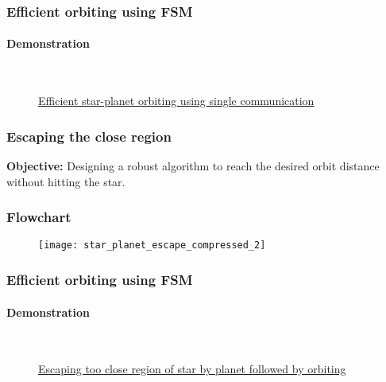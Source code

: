 \begin{frame}
\frametitle{Efficient orbiting using FSM}
\framesubtitle{Demonstration}
	\begin{figure}[H]
		\begin{center}
		\\
		\hspace{5cm}
		\caption{\href{https://youtu.be/LRgOzhAJI1k}{Efficient star-planet orbiting using single communication}}
		\label{fig:shape_formation_demo}
	\end{center}
	\end{figure}
\end{frame}

\begin{frame}
\frametitle{Escaping the close region}
\textbf{Objective:} Designing a robust algorithm to reach the desired orbit distance without hitting the star.
\end{frame}

\begin{frame}
\frametitle{Flowchart}
\begin{figure}[H]
	\centering
	\texttt{[image: star\_planet\_escape\_compressed\_2]}
\end{figure}
\end{frame}

\begin{frame}
\frametitle{Efficient orbiting using FSM}
\framesubtitle{Demonstration}
\begin{figure}[H]
	\begin{center}
	\\
	\hspace{5cm}
	\caption{\href{https://youtu.be/X6dGCLT0ho8}{Escaping too close region of star by planet followed by orbiting}}
	\label{fig:shape_formation_demo}
	\end{center}
\end{figure}
\end{frame}